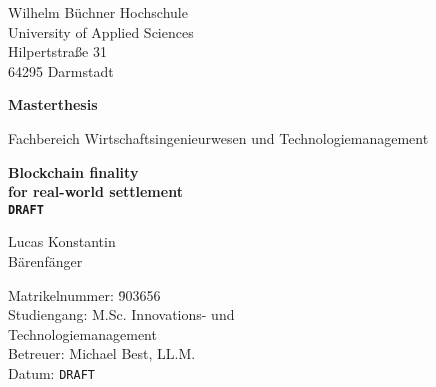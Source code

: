 \begin{titlepage}
  
  \large
  Wilhelm Büchner Hochschule \\
  University of Applied Sciences \\
  Hilpertstraße 31 \\
  64295 Darmstadt
  
  \vfill
  
  \begin{center}
    \Large
    \textbf{Masterthesis}
    
    \vspace{0.5cm}
    
    Fachbereich Wirtschaftsingenieurwesen und Technologiemanagement
    
    \vfill
    
    \Huge
    \textbf{
      Blockchain finality \\
      for real-world settlement \\
      \texttt{DRAFT}
    }

    \vfill

    \Large
    Lucas Konstantin \\
    Bärenfänger
  \end{center}

  \vfill
  
  \begin{tabbing}
    Matrikelnummer: \hspace{1em} \= 903656 \\
    Studiengang:                 \> M.Sc. Innovations- und \\ 
                                 \> Technologiemanagement \\
    Betreuer:                    \> Michael Best, LL.M. \\
    Datum:                       \> \texttt{DRAFT}
  \end{tabbing}

\end{titlepage}
